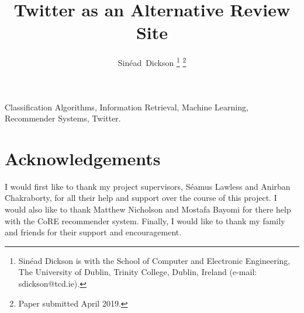 \documentclass[journal]{IEEEtran}
\begin{document}
\title{Twitter as an Alternative Review Site}

\author{Sin\'ead~Dickson
\thanks{Sin\'ead Dickson is with the School of Computer and Electronic Engineering, The University of Dublin, Trinity College, Dublin, Ireland (e-mail: sdickson@tcd.ie).}
\thanks{Paper submitted April 2019.}}

\maketitle



\begin{IEEEkeywords}
Classification Algorithms, Information Retrieval, Machine Learning, Recommender Systems, Twitter.
\end{IEEEkeywords}









\section*{Acknowledgements}
I would first like to thank my project supervisors, S\'eamus Lawless and Anirban Chakraborty, for all their help and support over the course of this project. 
I would also like to thank Matthew Nicholson and Mostafa Bayomi for there help with the CoRE recommender system.
Finally, I would like to thank my family and friends for their support and encouragement.



\end{document}
